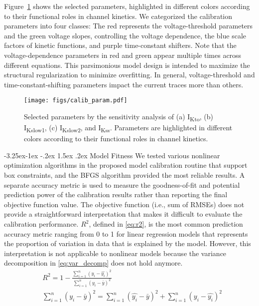 \documentclass[11pt]{article}
\makeatletter
\renewcommand\subsection{\@startsection{subsection}{2}{\z@}%
                                     {-3.25ex\@plus -1ex \@minus -.2ex}%
                                     {1.5ex \@plus .2ex}%
                                     {\normalfont\fontfamily{phv}\fontsize{14}{17}\bfseries}}
\makeatother
\begin{document}
Figure~\ref{fig:calib_param} shows the selected parameters, highlighted in different colors according to their functional roles in channel kinetics. We categorized the calibration parameters into four classes: The red represents the voltage-threshold parameters and the green voltage slopes, controlling the voltage dependence, the blue scale factors of kinetic functions, and purple time-constant shifters. Note that the voltage-dependence parameters in red and green appear multiple times across different equations. This parsimonious model design is intended to maximize the structural regularization to minimize overfitting. In general, voltage-threshold and time-constant-shifting parameters impact the current traces more than others. 
\begin{figure}[!ht]
    \centering
    \texttt{[image: figs/calib\_param.pdf]}
    \caption{Selected parameters by the sensitivity analysis of (a) I\textsubscript{Kto}, (b) I\textsubscript{Kslow1}, (c) I\textsubscript{Kslow2}, and I\textsubscript{Kss}. Parameters are highlighted in different colors according to their functional roles in channel kinetics.}
    \label{fig:calib_param}
\end{figure}

\subsection{Model Fitness}
We tested various nonlinear optimization algorithms in the proposed model calibration routine that support box constraints, and the BFGS algorithm provided the most reliable results. A separate accuracy metric is used to measure the goodness-of-fit and potential prediction power of the calibration results rather than reporting the final objective function value. The objective function (i.e., sum of RMSEs) does not provide a straightforward interpretation that makes it difficult to evaluate the calibration performance. $R^{2}$, defined in \eqref{eq:r2}, is the most common prediction accuracy metric ranging from 0 to 1 for linear regression models that represents the proportion of variation in data that is explained by the model. However, this interpretation is not applicable to nonlinear models because the variance decomposition in \eqref{eq:var_decomp} does not hold anymore.
\begin{align}
    \label{eq:r2}
    &R^{2} = 1 - \frac{\sum_{i=1}^{n}(y_{i}-\hat{y_{i}})^2}{\sum_{i=1}^{n}(y_{i}-\bar{y})^2} \\
    \label{eq:var_decomp}
    &\sum_{i=1}^{n}(y_{i}-\bar{y})^2 = \sum_{i=1}^{n}(\hat{y_{i}}-\bar{y})^2+\sum_{i=1}^{n}(y_{i}-\hat{y_{i}})^2
\end{align}
\end{document}
